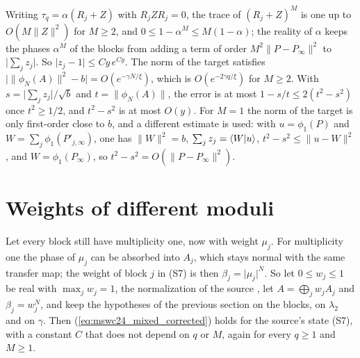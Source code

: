 \documentclass{article}
\begin{document}
Writing $\tau_q=\alpha(R_j+Z)$ with $R_jZR_j=0$, the trace of $(R_j+Z)^M$ is one up to
$O(M\lVert Z\rVert^2)$ for $M\geq2$, and $0\leq1-\alpha^M\leq M(1-\alpha)$; the reality of $\alpha$
keeps the phases $\alpha^M$ of the blocks from adding a term of order $M^2\lVert P-P_\infty\rVert^2$
to $\lvert\sum_jz_j\rvert$. So $\lvert z_j-1\rvert\leq Cy\,e^{Cy}$. The norm of the target satisfies
$\lvert\lVert\phi_N(A)\rVert^2-b\rvert=O(e^{-\gamma N/\xi})$, which is $O(e^{-2\gamma q/\xi})$ for
$M\geq2$. With $s=\lvert\sum_jz_j\rvert/\sqrt b$ and $t=\lVert\phi_N(A)\rVert$, the error is at most
$1-s/t\leq2(t^2-s^2)$ once $t^2\geq1/2$, and $t^2-s^2$ is at most $O(y)$. For $M=1$ the norm of
the target is only first-order close to $b$, and a different estimate is used: with
$u=\phi_1(P)$ and $W=\sum_j\phi_1(P'_{j,\infty})$, one has $\lVert W\rVert^2=b$, $\sum_jz_j=\langle W | u \rangle$,
$t^2-s^2\leq\lVert u-W\rVert^2$, and $W=\phi_1(P_\infty)$, so $t^2-s^2=O(\lVert P-P_\infty\rVert^2)$.

\section{Weights of different moduli}
Let every block still have multiplicity one, now with weight $\mu_j$. For multiplicity one the
phase of $\mu_j$ can be absorbed into $A_j$, which stays normal with the same transfer map; the
weight of block $j$ in (S7) is then $\beta_j=\lvert\mu_j\rvert^N$. So let $0\leq w_j\leq1$ be real
with $\max_jw_j=1$, the normalization of the source \cite[after eq.~(S2)]{Malz2024Preparation},
let $A=\bigoplus_jw_jA_j$ and $\beta_j=w_j^N$, and keep the hypotheses of the previous section on
the blocks, on $\lambda_2$ and on $\gamma$. Then (\ref{eq:mswc24_mixed_corrected}) holds for the
source's state (S7), with a constant $C$ that does not depend on $q$ or $M$, again for every
$q\geq1$ and $M\geq1$.
\end{document}
